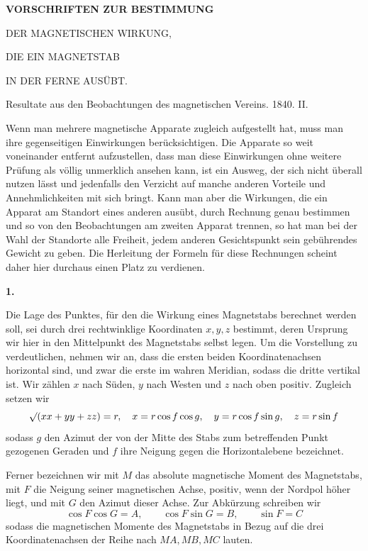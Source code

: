 \clearpage
{}
\begin{center}
{\Large\bfseries VORSCHRIFTEN ZUR BESTIMMUNG\par\medskip DER MAGNETISCHEN WIRKUNG,\par\medskip DIE EIN MAGNETSTAB\par\medskip IN DER FERNE AUSÜBT.}
\par\bigskip
Resultate aus den Beobachtungen des magnetischen Vereins. 1840. II.
\end{center}
\renewcommand{\Article}[1]{\par\medskip\Needspace{4\baselineskip}\pdfbookmark[1]{#1.}{fernwirkung-art-#1}\centerline{\textbf{#1.}}\nobreak\smallskip}%
Wenn man mehrere magnetische Apparate zugleich aufgestellt hat, muss man ihre gegenseitigen Einwirkungen berücksichtigen. Die Apparate so weit voneinander entfernt aufzustellen, dass man diese Einwirkungen ohne weitere Prüfung als völlig unmerklich ansehen kann, ist ein Ausweg, der sich nicht überall nutzen lässt und jedenfalls den Verzicht auf manche anderen Vorteile und Annehmlichkeiten mit sich bringt. Kann man aber die Wirkungen, die ein Apparat am Standort eines anderen ausübt, durch Rechnung genau bestimmen und so von den Beobachtungen am zweiten Apparat trennen, so hat man bei der Wahl der Standorte alle Freiheit, jedem anderen Gesichtspunkt sein gebührendes Gewicht zu geben. Die Herleitung der Formeln für diese Rechnungen scheint daher hier durchaus einen Platz zu verdienen.

\Article{1}
Die Lage des Punktes, für den die Wirkung eines Magnetstabs berechnet werden soll, sei durch drei rechtwinklige Koordinaten $x,y,z$ bestimmt, deren Ursprung wir hier in den Mittelpunkt des Magnetstabs selbst legen. Um die Vorstellung zu verdeutlichen, nehmen wir an, dass die ersten beiden Koordinatenachsen horizontal sind, und zwar die erste im wahren Meridian, sodass die dritte
vertikal ist. Wir zählen $x$ nach Süden, $y$ nach Westen und $z$ nach oben positiv. Zugleich setzen wir
\[
\mathord{{}^{}\!\surd}(xx+yy+zz)=r,\quad x=r\cos f\cos g,\quad y=r\cos f\sin g,\quad z=r\sin f
\]
sodass $g$ den Azimut der von der Mitte des Stabs zum betreffenden Punkt gezogenen Geraden und $f$ ihre Neigung gegen die Horizontalebene bezeichnet.

Ferner bezeichnen wir mit $M$ das absolute magnetische Moment des Magnetstabs, mit $F$ die Neigung seiner magnetischen Achse, positiv, wenn der Nordpol höher liegt, und mit $G$ den Azimut dieser Achse. Zur Abkürzung schreiben wir
\[
\cos F\cos G=A,\qquad\cos F\sin G=B,\qquad\sin F=C
\]
sodass die magnetischen Momente des Magnetstabs in Bezug auf die drei Koordinatenachsen der Reihe nach $MA,MB,MC$ lauten.

